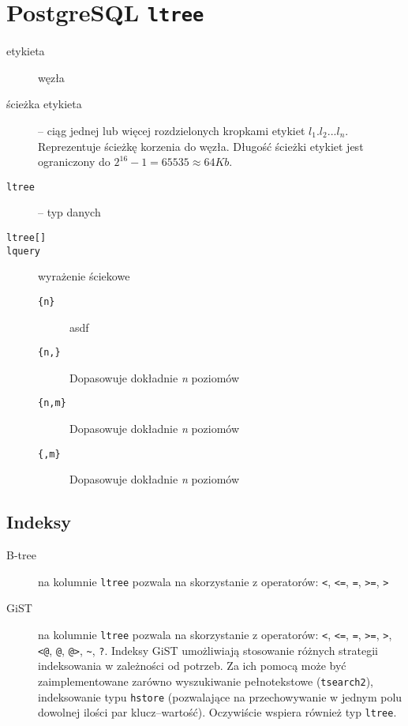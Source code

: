 \section{PostgreSQL \texttt{ltree}}


\begin{description}
    \item[etykieta]  węzła 
    \item[ścieżka etykieta]
         -- ciąg jednej lub więcej rozdzielonych kropkami etykiet $l_1.l_2...l_n$. 
        Reprezentuje ścieżkę korzenia do węzła. 
        Długość ścieżki etykiet jest ograniczony do $2^{16} - 1 = 65535 \approx 64 Kb$. 
          

\end{description}


\begin{description}
    \item[\texttt{ltree}] -- typ danych
    \item[\texttt{ltree[]}]
    \item[\texttt{lquery}] wyrażenie ściekowe
    \begin{description}
        \item[\texttt{\{n\}}] asdf
        \item[\texttt{\{n,\}}] Dopasowuje dokładnie \emph{n} poziomów
        \item[\texttt{\{n,m\}}] Dopasowuje dokładnie \emph{n} poziomów
        \item[\texttt{\{,m\}}] Dopasowuje dokładnie \emph{n} poziomów
    \end{description}
\end{description}

\subsection*{Indeksy}

\begin{description}
    \item[B-tree] na kolumnie \texttt{ltree} pozwala na skorzystanie z operatorów: \verb|<|, \verb|<=|, \verb|=|, \verb|>=|, \verb|>|
    \item[GiST] na kolumnie \texttt{ltree} pozwala na skorzystanie z operatorów: 
        \verb|<|, \verb|<=|, \verb|=|, \verb|>=|, \verb|>|, \verb|<@|, \verb|@|, \verb|@>|, \verb|~|, \verb|?|.
        Indeksy GiST  umożliwiają stosowanie różnych strategii indeksowania w zależności od potrzeb.
        Za ich pomocą może być zaimplementowane zarówno wyszukiwanie pełnotekstowe (\texttt{tsearch2}), 
        indeksowanie typu \texttt{hstore} (pozwalające na przechowywanie w jednym polu dowolnej ilości par klucz--wartość).
        Oczywiście wspiera również typ \texttt{ltree}.
\end{description}

